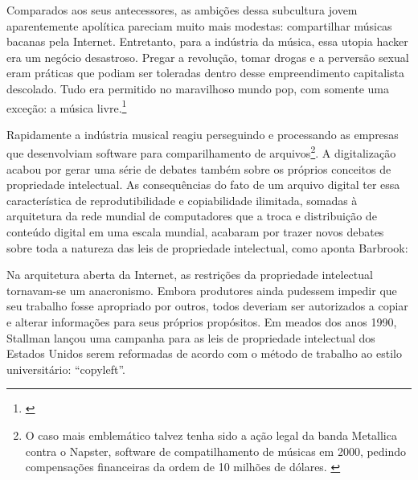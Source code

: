 \begin{citacao}
Comparados aos seus antecessores, as ambições dessa subcultura jovem aparentemente apolítica pareciam muito mais modestas: compartilhar músicas bacanas pela Internet. Entretanto, para a indústria da música, essa utopia hacker era um negócio desastroso. Pregar a revolução, tomar drogas e a perversão sexual eram práticas que podiam ser toleradas dentro desse empreendimento capitalista descolado. Tudo era permitido no maravilhoso mundo pop, com somente uma exceção: a música livre.\footnote{\cite[370]{Barbrook2009}}
\end{citacao}

Rapidamente a indústria musical reagiu perseguindo e processando as empresas que desenvolviam software para comparilhamento de arquivos\footnote{O caso mais emblemático talvez tenha sido a ação legal da banda Metallica contra o Napster, software de compatilhamento de músicas em 2000, pedindo compensações financeiras da ordem de 10 milhões de dólares. \cite{Doan2000}}. A digitalização acabou por gerar uma série de debates também sobre os próprios conceitos de propriedade intelectual. As consequências do fato de um arquivo digital ter essa característica de reprodutibilidade e copiabilidade ilimitada, somadas à arquitetura da rede mundial de computadores que a troca e distribuição de conteúdo digital em uma escala mundial, acabaram por trazer novos debates sobre toda a natureza das leis de propriedade intelectual, como aponta Barbrook:


\begin{citacao}
Na arquitetura aberta da Internet, as restrições da propriedade intelectual tornavam-se um anacronismo. Embora produtores ainda pudessem impedir que seu trabalho fosse apropriado por outros, todos deveriam ser autorizados a copiar e alterar informações para seus próprios propósitos. Em meados dos anos 1990, Stallman lançou uma campanha para as leis de propriedade intelectual dos Estados Unidos serem reformadas de acordo com o método de trabalho ao estilo universitário: “copyleft”. \cite[368]{Barbrook2009} \citeyear{Barbrook2009}
\end{citacao}

